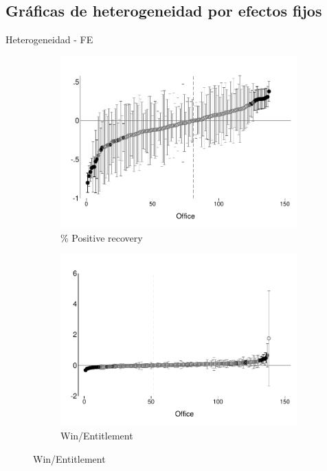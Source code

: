 \documentclass[8pt]{beamer}
\begin{document}
\subsection{Gráficas de heterogeneidad por efectos fijos}
\begin{frame}[allowframebreaks]{Heterogeneidad - FE}
           \begin{figure}[H]
\caption{Heterogeneous outcome graphs}
    \begin{center}
     \begin{subfigure}{0.25\textwidth}
    \caption*{\% Positive recovery}
            \centering
            \includegraphics[width=\textwidth]{Figuras/betas_pos_rec.pdf}
        \end{subfigure}
                \begin{subfigure}{0.25\textwidth}
            \caption*{Win/Entitlement}
            \centering
            \includegraphics[width=\textwidth]{Figuras/betas_win_minley.pdf}

\end{subfigure}
\end{center}
\end{figure}
\end{frame}
\end{document}
